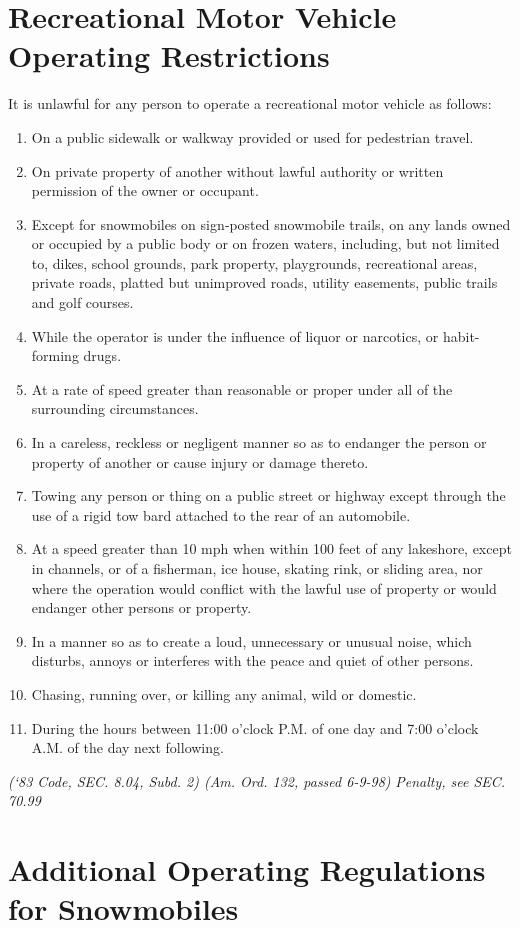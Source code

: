 \section{Recreational Motor Vehicle Operating Restrictions}
It is unlawful for any person to operate a recreational motor vehicle as follows:
\begin{enumerate}[{\indent}A)]
\item On a public sidewalk or walkway provided or used for pedestrian travel.
\item On private property of another without lawful authority or written permission of the owner or occupant.
\item Except for snowmobiles on sign‑posted snowmobile trails, on any lands owned or occupied by a public body or on frozen waters, including, but not limited to, dikes, school grounds, park property, playgrounds, recreational areas, private roads, platted but unimproved roads, utility easements, public trails and golf courses.
\item While the operator is under the influence of liquor or narcotics, or habit-forming drugs.
\item At a rate of speed greater than reasonable or proper under all of the surrounding circumstances.
\item In a careless, reckless or negligent manner so as to endanger the person or property of another or cause injury or damage thereto.
\item Towing any person or thing on a public street or highway except through the use of a rigid tow bard attached to the rear of an automobile.
\item At a speed greater than 10 mph when within 100 feet of any lakeshore, except in channels, or of a fisherman, ice house, skating rink, or sliding area, nor where the operation would conflict with the lawful use of property or would endanger other persons or property.
\item In a manner so as to create a loud, unnecessary or unusual noise, which disturbs, annoys or interferes with the peace and quiet of other persons.
\item Chasing, running over, or killing any animal, wild or domestic.
\item During the hours between 11:00 o'clock P.M. of one day and 7:00 o'clock A.M. of the day next following.
\end{enumerate}
\emph{(‘83 Code, SEC. 8.04, Subd. 2) (Am. Ord. 132, passed 6-9-98)}
\emph{Penalty, see SEC. 70.99}
\section{Additional Operating Regulations for Snowmobiles}
